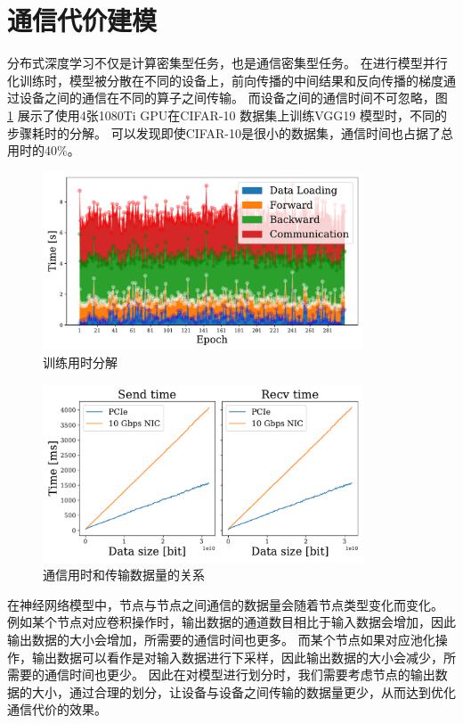 \section{通信代价建模}
\label{sec:commu}
分布式深度学习不仅是计算密集型任务，也是通信密集型任务。
在进行模型并行化训练时，模型被分散在不同的设备上，前向传播的中间结果和反向传播的梯度通过设备之间的通信在不同的算子之间传输。
而设备之间的通信时间不可忽略，图 \ref{fig:overhead} 展示了使用4张1080Ti GPU在CIFAR-10  数据集上训练VGG19  模型时，不同的步骤耗时的分解。
可以发现即使CIFAR-10是很小的数据集，通信时间也占据了总用时的40\%。

\begin{figure}[h]
	\centering
	\includegraphics[width=0.85\textwidth]{figure/3-system/overhead_decomposition.pdf}
	\caption{训练用时分解}
	\label{fig:overhead}
\end{figure}

\begin{figure}[h]
	\centering
	\includegraphics[width=0.85\textwidth]{figure/3-system/commu.pdf}
	\caption{通信用时和传输数据量的关系}
	\label{fig:linear}
\end{figure}
在神经网络模型中，节点与节点之间通信的数据量会随着节点类型变化而变化。
例如某个节点对应卷积操作时，输出数据的通道数目相比于输入数据会增加，因此输出数据的大小会增加，所需要的通信时间也更多。
而某个节点如果对应池化操作，输出数据可以看作是对输入数据进行下采样，因此输出数据的大小会减少，所需要的通信时间也更少。
因此在对模型进行划分时，我们需要考虑节点的输出数据的大小，通过合理的划分，让设备与设备之间传输的数据量更少，从而达到优化通信代价的效果。

